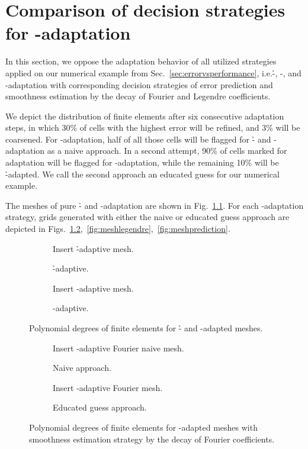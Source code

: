 \chapter{Comparison of decision strategies for \hp-adaptation}
\label{app::strategies}

In this section, we oppose the adaptation behavior of all utilized strategies applied on our numerical example from Sec.~\ref{sec:errorvsperformance}, i.e.\@ \h-, \p-, and \hp-adaptation with corresponding decision strategies of error prediction and smoothness estimation by the decay of Fourier and Legendre coefficients.

We depict the distribution of finite elements after six consecutive adaptation steps, in which 30\% of cells with the highest error will be refined, and 3\% will be coarsened. For \hp-adaptation, half of all those cells will be flagged for \h- and \p-adaptation as a naive approach. In a second attempt, 90\% of cells marked for adaptation will be flagged for \p-adaptation, while the remaining 10\% will be \h-adapted. We call the second approach an educated guess for our numerical example.

The meshes of pure \h- and \p-adaptation are shown in Fig.~\ref{fig:meshnonhp}. For each \hp-adaptation strategy, grids generated with either the naive or educated guess approach are depicted in Figs.~\ref{fig:meshfourier},~\ref{fig:meshlegendre},~\ref{fig:meshprediction}.




\begin{figure}
\begin{subfigure}{.49\textwidth}
  \centering
  Insert \h-adaptive mesh.
  \caption{\h-adaptive.}
\end{subfigure}
\begin{subfigure}{.49\textwidth}
  \centering
  Insert \p-adaptive mesh.
  \caption{\p-adaptive.}
\end{subfigure}
\caption{Polynomial degrees of finite elements for \h- and \p-adapted meshes.}
\label{fig:meshnonhp}
\end{figure}

\begin{figure}
\begin{subfigure}{.49\textwidth}
  \centering
  Insert \hp-adaptive Fourier naive mesh.
  \caption{Naive approach.}
\end{subfigure}
\begin{subfigure}{.49\textwidth}
  \centering
  Insert \hp-adaptive Fourier mesh.
  \caption{Educated guess approach.}
\end{subfigure}
\caption{Polynomial degrees of finite elements for \hp-adapted meshes with smoothness estimation strategy by the decay of Fourier coefficients.}
\label{fig:meshfourier}
\end{figure}

